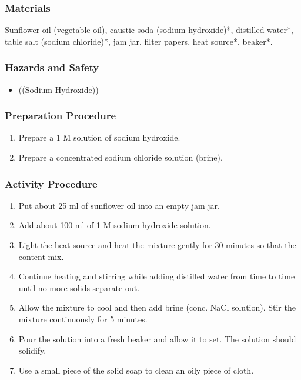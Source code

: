 \subsubsection*{Materials}
Sunflower oil (vegetable oil), caustic soda (sodium hydroxide)*, distilled water*, table salt (sodium chloride)*, jam jar, filter papers, heat source*, beaker*.

\subsubsection*{Hazards and Safety}
\begin{itemize}
\item{((Sodium Hydroxide))}
\end{itemize}

\subsubsection*{Preparation Procedure}
\begin{enumerate}
\item{Prepare a 1 M solution of sodium hydroxide.}
\item{Prepare a concentrated sodium chloride solution (brine).}
\end{enumerate}

\subsubsection*{Activity Procedure}
\begin{enumerate}
\item{Put about 25 ml of sunflower oil into an empty jam jar.}
\item{Add about 100 ml of 1 M sodium hydroxide solution.}
\item{Light the heat source and heat the mixture gently for 30 minutes so that the content mix.}
\item{Continue heating and stirring while adding distilled water from time to time until no more solids separate out.}
\item{Allow the mixture to cool and then add brine (conc. NaCl solution). Stir the mixture continuously for 5 minutes.}
\item{Pour the solution into a fresh beaker and allow it to set. The solution should solidify.}
\item{Use a small piece of the solid soap to clean an oily piece of cloth.}
\end{enumerate}

